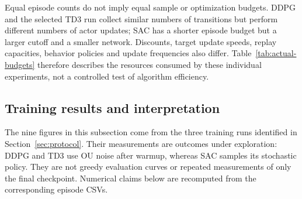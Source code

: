 \documentclass[11pt,a4paper]{article}
\theoremstyle{definition}
\theoremstyle{plain}
\theoremstyle{remark}
\newcommand{\code}[1]{\texttt{#1}}
\begin{document}
Equal episode counts do not imply equal sample or optimization budgets. DDPG and the selected TD3 run collect similar numbers of transitions but perform different numbers of actor updates; SAC has a shorter episode budget but a larger cutoff and a smaller network. Discounts, target update speeds, replay capacities, behavior policies and update frequencies also differ. Table~\ref{tab:actual-budgets} therefore describes the resources consumed by these individual experiments, not a controlled test of algorithm efficiency.



\subsection{Training results and interpretation}
\label{sec:continuous-results}

The nine figures in this subsection come from the three training runs identified in Section~\ref{sec:protocol}. Their measurements are outcomes under exploration: DDPG and TD3 use OU noise after warmup, whereas SAC samples its stochastic policy. They are not greedy evaluation curves or repeated measurements of only the final checkpoint. Numerical claims below are recomputed from the corresponding episode CSVs.
\end{document}
